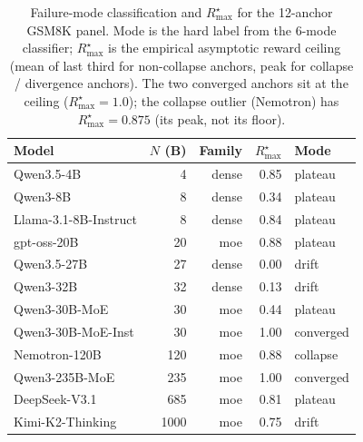 \begin{table}[t]
\centering
\small
\caption{Failure-mode classification and $R_\mathrm{max}^\star$ for the
12-anchor GSM8K panel.  Mode is the hard label from the 6-mode
classifier; $R_\mathrm{max}^\star$ is the empirical asymptotic reward
ceiling (mean of last third for non-collapse anchors, peak for
collapse / divergence anchors).  The two converged anchors sit at the
ceiling ($R_\mathrm{max}^\star = 1.0$); the collapse outlier (Nemotron)
has $R_\mathrm{max}^\star = 0.875$ (its peak, not its floor).
\label{tab:iter105-modes}}
\begin{tabular}{lrrrl}
\toprule
Model & $N$ (B) & Family & $R_\mathrm{max}^\star$ & Mode \\
\midrule
Qwen3.5-4B            &    4 & dense & 0.85 & plateau \\
Qwen3-8B              &    8 & dense & 0.34 & plateau \\
Llama-3.1-8B-Instruct &    8 & dense & 0.84 & plateau \\
gpt-oss-20B           &   20 & moe   & 0.88 & plateau \\
Qwen3.5-27B           &   27 & dense & 0.00 & drift \\
Qwen3-32B             &   32 & dense & 0.13 & drift \\
Qwen3-30B-MoE         &   30 & moe   & 0.44 & plateau \\
Qwen3-30B-MoE-Inst    &   30 & moe   & 1.00 & converged \\
Nemotron-120B         &  120 & moe   & 0.88 & collapse \\
Qwen3-235B-MoE        &  235 & moe   & 1.00 & converged \\
DeepSeek-V3.1         &  685 & moe   & 0.81 & plateau \\
Kimi-K2-Thinking      & 1000 & moe   & 0.75 & drift \\
\bottomrule
\end{tabular}
\end{table}